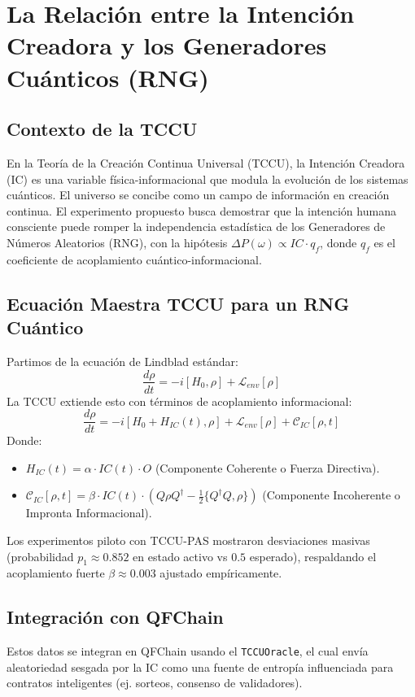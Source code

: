 \chapter{La Relación entre la Intención Creadora y los Generadores Cuánticos (RNG)}
\section{Contexto de la TCCU}
En la Teoría de la Creación Continua Universal (TCCU), la Intención Creadora (IC) es una variable física-informacional que modula la evolución de los sistemas cuánticos. El universo se concibe como un campo de información en creación continua. El experimento propuesto busca demostrar que la intención humana consciente puede romper la independencia estadística de los Generadores de Números Aleatorios (RNG), con la hipótesis $\Delta P(\omega) \propto IC \cdot q_f$, donde $q_f$ es el coeficiente de acoplamiento cuántico-informacional.

\section{Ecuación Maestra TCCU para un RNG Cuántico}
Partimos de la ecuación de Lindblad estándar:
\begin{equation}
\frac{d\rho}{dt} = -i [H_0, \rho] + \mathcal{L}_{env}[\rho]
\end{equation}
La TCCU extiende esto con términos de acoplamiento informacional:
\begin{equation}
\frac{d\rho}{dt} = -i [H_0 + H_{IC}(t), \rho] + \mathcal{L}_{env}[\rho] + \mathcal{C}_{IC}[\rho, t]
\end{equation}
Donde:
\begin{itemize}
    \item $H_{IC}(t) = \alpha \cdot IC(t) \cdot O$ (Componente Coherente o Fuerza Directiva).
    \item $\mathcal{C}_{IC}[\rho, t] = \beta \cdot IC(t) \cdot \left(Q\rho Q^\dagger - \frac{1}{2}\{Q^\dagger Q, \rho\}\right)$ (Componente Incoherente o Impronta Informacional).
\end{itemize}

Los experimentos piloto con TCCU-PAS mostraron desviaciones masivas (probabilidad $p_1 \approx 0.852$ en estado activo vs $0.5$ esperado), respaldando el acoplamiento fuerte $\beta \approx 0.003$ ajustado empíricamente.

\section{Integración con QFChain}
Estos datos se integran en QFChain usando el \texttt{TCCUOracle}, el cual envía aleatoriedad sesgada por la IC como una fuente de entropía influenciada para contratos inteligentes (ej. sorteos, consenso de validadores).